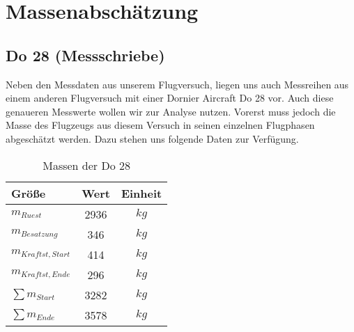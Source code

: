 \chapter{Massenabschätzung}
\label{chapter:masse}

\section{Do 28 (Messschriebe)}
Neben den Messdaten aus unserem Flugversuch, liegen uns auch Messreihen aus einem anderen Flugversuch mit einer Dornier Aircraft Do 28 vor. Auch diese genaueren Messwerte wollen wir zur Analyse nutzen. Vorerst muss jedoch die Masse des Flugzeugs aus diesem Versuch in seinen einzelnen Flugphasen abgeschätzt werden. Dazu stehen uns folgende Daten zur Verfügung. \\

\begin{table}[h]
	\centering
	\begin{tabular}{|l|c|c|}
		\hline
		\textbf{Größe}		 & \textbf{Wert}& \textbf{Einheit} \\ \hline
		$m_{Ruest}$  		 & 2936			& $kg$        \\ \hline
		$m_{Besatzung}$ 	 & 346			& $kg$		  \\ \hline
		$m_{Kraftst,Start}$	 & 414			& $kg$		  \\ \hline
		$m_{Kraftst,Ende}$	 & 296			& $kg$		  \\ \hline
		$\sum m_{Start}$	 & 3282			& $kg$		  \\ \hline
		$\sum m_{Ende}$	 & 3578			& $kg$		   \\ \hline
		
		
		
		
	\end{tabular}
	\caption{Massen der Do 28}
\end{table}


